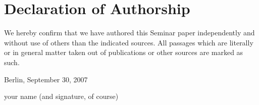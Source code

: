 
\section*{Declaration of Authorship}

We hereby confirm that we have authored this Seminar paper independently and without use
of others than the indicated sources. All passages which are literally or in general matter taken
out of publications or other sources are marked as such.
\vspace{1cm}

Berlin, September 30, 2007 \vspace{0.5cm}

your name (and signature, of course)
